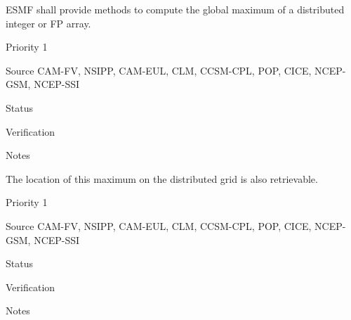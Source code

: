 






ESMF shall provide methods to compute the global maximum of a
distributed integer or FP array.

\begin{reqlist}
\item[Priority] 1
\item[Source] CAM-FV, NSIPP, CAM-EUL, CLM, CCSM-CPL, POP, CICE, NCEP-GSM, NCEP-SSI
\item[Status]
\item[Verification]
\item[Notes]
\end{reqlist}



The location of this maximum on the distributed grid is also
retrievable.

\begin{reqlist}
\item[Priority] 1
\item[Source] CAM-FV, NSIPP, CAM-EUL, CLM, CCSM-CPL, POP, CICE, NCEP-GSM, NCEP-SSI
\item[Status]
\item[Verification]
\item[Notes]
\end{reqlist}


